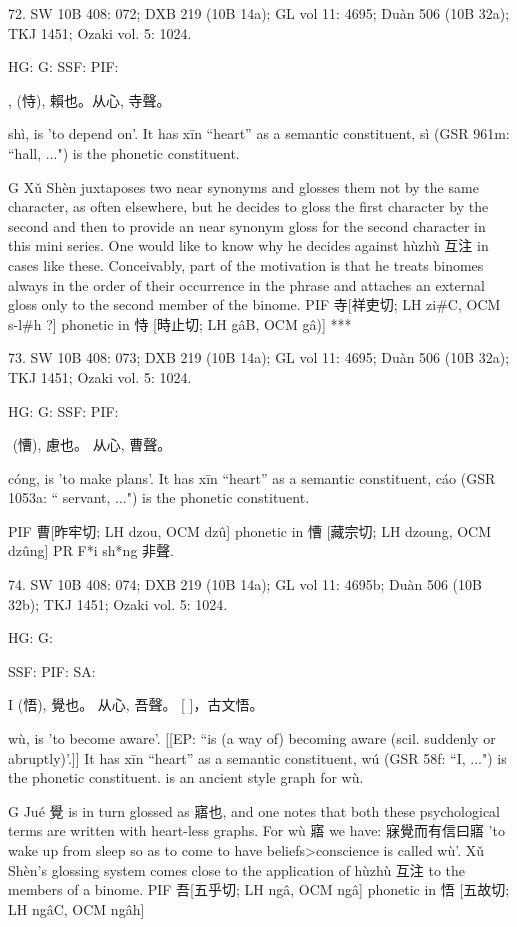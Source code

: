 72. SW 10B 408: 072; DXB 219 (10B 14a); GL vol 11: 4695; Duàn 506 (10B 32a); TKJ 1451; Ozaki vol. 5: 1024.


HG:
G: SSF: PIF:

, (恃),
賴也。从心, 寺聲。


shì,
is 'to depend on'.
It has xīn ``heart'' as a semantic constituent,
sì (GSR 961m: ``hall, ...") is the phonetic constituent.



G Xǔ Shèn juxtaposes two near synonyms and glosses them not by the same character, as often elsewhere, but he decides to gloss the first character by the second and then to provide an near synonym gloss for the second character in this mini series. One would like to know why he decides against hùzhù 互注 in cases like these. Conceivably, part of the motivation is that he treats binomes always in the order of their occurrence in the phrase and attaches an external gloss only to the second member of the binome.
PIF     寺[祥吏切; LH zi\#C, OCM s-l\#h ?] phonetic in 恃 [時止切; LH gâB, OCM gâ)]
***

73. SW 10B 408: 073; DXB 219 (10B 14a); GL vol 11: 4695; Duàn 506 (10B 32a); TKJ 1451; Ozaki vol. 5: 1024.


HG:
G: SSF: PIF:

 (慒), 慮也。 从心,
曹聲。


cóng,
is 'to make plans'.
It has xīn ``heart'' as a semantic constituent,
cáo (GSR 1053a: `` servant, ...") is the phonetic constituent.

PIF     曹[昨牢切; LH dzou, OCM dzû] phonetic in 慒 [藏宗切; LH dzoung, OCM dzûng]
PR	F*i sh*ng 非聲.

74. SW 10B 408: 074; DXB 219 (10B 14a); GL vol 11: 4695b; Duàn 506 (10B 32b); TKJ 1451; Ozaki vol. 5: 1024.


HG:
G:

SSF: PIF: SA:

I (悟),
覺也。
从心, 吾聲。
[	]，古文悟。


wù,
is 'to become aware'. [[EP: ``is (a way of) becoming aware (scil. suddenly or abruptly)'.]]
It has xīn ``heart'' as a semantic constituent,
wú (GSR 58f: ``I, ...") is the phonetic constituent. is an ancient style graph for wù.

G Jué 覺 is in turn glossed as 寤也, and one notes that both these psychological terms are written with heart-less graphs. For wù 寤 we have: 寐覺而有信曰寤 'to wake up from sleep so as to come to have beliefs>conscience is called wù'. Xǔ Shèn's glossing system comes close to the application of hùzhù 互注 to the members of a binome.
PIF    吾[五乎切; LH ngâ, OCM ngâ] phonetic in 悟 [五故切; LH ngâC, OCM ngâh]



